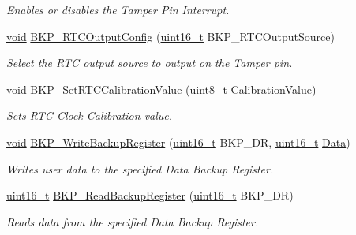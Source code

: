 \begin{DoxyCompactItemize}
\begin{DoxyCompactList}\small\item\em Enables or disables the Tamper Pin Interrupt. \end{DoxyCompactList}\item 
\hyperlink{group___n_a_m_e_ga18028b8badbf1ea7e704ccac3c488e82}{void} \hyperlink{group___b_k_p___private___functions_ga3d1b22b3c6a79f7b423616a0af1885bf}{B\-K\-P\-\_\-\-R\-T\-C\-Output\-Config} (\hyperlink{stdint_8h_a273cf69d639a59973b6019625df33e30}{uint16\-\_\-t} B\-K\-P\-\_\-\-R\-T\-C\-Output\-Source)
\begin{DoxyCompactList}\small\item\em Select the R\-T\-C output source to output on the Tamper pin. \end{DoxyCompactList}\item 
\hyperlink{group___n_a_m_e_ga18028b8badbf1ea7e704ccac3c488e82}{void} \hyperlink{group___b_k_p___private___functions_gad34db08a944450d2e7d56d0fd8db2bca}{B\-K\-P\-\_\-\-Set\-R\-T\-C\-Calibration\-Value} (\hyperlink{stdint_8h_aba7bc1797add20fe3efdf37ced1182c5}{uint8\-\_\-t} Calibration\-Value)
\begin{DoxyCompactList}\small\item\em Sets R\-T\-C Clock Calibration value. \end{DoxyCompactList}\item 
\hyperlink{group___n_a_m_e_ga18028b8badbf1ea7e704ccac3c488e82}{void} \hyperlink{group___b_k_p___private___functions_ga18d220387db651b3cb71fad5c092e041}{B\-K\-P\-\_\-\-Write\-Backup\-Register} (\hyperlink{stdint_8h_a273cf69d639a59973b6019625df33e30}{uint16\-\_\-t} B\-K\-P\-\_\-\-D\-R, \hyperlink{stdint_8h_a273cf69d639a59973b6019625df33e30}{uint16\-\_\-t} \hyperlink{group___copter_control_b_l_ga6f3335509cc4943e20df66f72483910c}{Data})
\begin{DoxyCompactList}\small\item\em Writes user data to the specified Data Backup Register. \end{DoxyCompactList}\item 
\hyperlink{stdint_8h_a273cf69d639a59973b6019625df33e30}{uint16\-\_\-t} \hyperlink{group___b_k_p___private___functions_ga359d8fbc945e0f4e34fedbe037d842c8}{B\-K\-P\-\_\-\-Read\-Backup\-Register} (\hyperlink{stdint_8h_a273cf69d639a59973b6019625df33e30}{uint16\-\_\-t} B\-K\-P\-\_\-\-D\-R)
\begin{DoxyCompactList}\small\item\em Reads data from the specified Data Backup Register. \end{DoxyCompactList}\item 

\end{DoxyCompactItemize}

